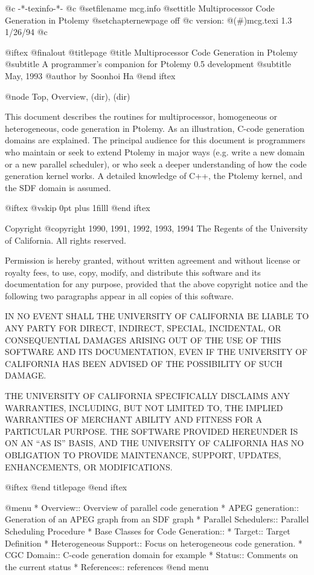       @c -*-texinfo-*-
@c %
@setfilename mcg.info
@settitle Multiprocessor Code Generation in Ptolemy
@setchapternewpage off
@c version: @(#)mcg.texi	1.3	1/26/94
@c %

@iftex
@finalout
@titlepage
@title Multiprocessor Code Generation in Ptolemy
@subtitle A programmer's companion for Ptolemy 0.5 development
@subtitle May, 1993
@author by Soonhoi Ha
@end iftex

@node Top, Overview, (dir), (dir)

This document describes the routines for multiprocessor, homogeneous or
heterogeneous, code generation in Ptolemy. As an illustration, C-code
generation domains are explained. The principal audience for
this document is programmers who maintain or 
seek to extend Ptolemy in major ways
(e.g. write a new domain or a new parallel scheduler), or who seek a
deeper understanding of how the code generation kernel works.  
A detailed knowledge of C++, the Ptolemy kernel, and the SDF domain
is assumed. 

@iftex
@vskip 0pt plus 1filll
@end iftex

Copyright @copyright{} 1990, 1991, 1992, 1993, 1994 The Regents of the University of
California.  All rights reserved.

Permission is hereby granted, without written agreement and without
license or royalty fees, to use, copy, modify, and distribute this
software and its documentation for any purpose, provided that the above
copyright notice and the following two paragraphs appear in all copies of
this software.

IN NO EVENT SHALL THE UNIVERSITY OF CALIFORNIA BE LIABLE TO ANY PARTY FOR
DIRECT, INDIRECT, SPECIAL, INCIDENTAL, OR CONSEQUENTIAL DAMAGES ARISING
OUT OF THE USE OF THIS SOFTWARE AND ITS DOCUMENTATION, EVEN IF THE
UNIVERSITY OF CALIFORNIA HAS BEEN ADVISED OF THE POSSIBILITY OF SUCH
DAMAGE.

THE UNIVERSITY OF CALIFORNIA SPECIFICALLY DISCLAIMS ANY WARRANTIES,
INCLUDING, BUT NOT LIMITED TO, THE IMPLIED WARRANTIES OF MERCHANT ABILITY
AND FITNESS FOR A PARTICULAR PURPOSE. THE SOFTWARE PROVIDED HEREUNDER IS
ON AN ``AS IS'' BASIS, AND THE UNIVERSITY OF CALIFORNIA HAS NO OBLIGATION
TO PROVIDE MAINTENANCE, SUPPORT, UPDATES, ENHANCEMENTS, OR MODIFICATIONS.

@iftex
@end titlepage
@end iftex

@menu
* Overview::              	Overview of parallel code generation
* APEG generation::		Generation of an APEG graph from an SDF graph
* Parallel Schedulers::         Parallel Scheduling Procedure
* Base Classes for Code Generation:: 
* Target::          		Target Definition
* Heterogeneous Support::	Focus on heterogeneous code generation.
* CGC Domain::			C-code generation domain for example
* Status::			Comments on the current status
* References::			references
@end menu

